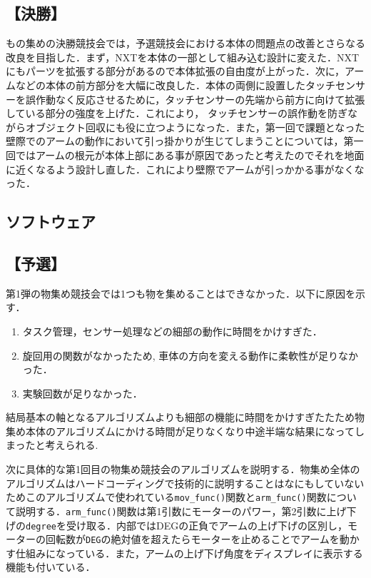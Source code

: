 \begin{multicols*}{2}
\subsection*{【決勝】}
もの集めの決勝競技会では，予選競技会における本体の問題点の改善とさらなる改良を目指した．まず，NXTを本体の一部として組み込む設計に変えた．NXTにもパーツを拡張する部分があるので本体拡張の自由度が上がった．次に，アームなどの本体の前方部分を大幅に改良した．本体の両側に設置したタッチセンサーを誤作動なく反応させるために，タッチセンサーの先端から前方に向けて拡張している部分の強度を上げた．これにより， タッチセンサーの誤作動を防ぎながらオブジェクト回収にも役に立つようになった．また，第一回で課題となった壁際でのアームの動作において引っ掛かりが生じてしまうことについては，第一回ではアームの根元が本体上部にある事が原因であったと考えたのでそれを地面に近くなるよう設計し直した．これにより壁際でアームが引っかかる事がなくなった．

\subsection{ソフトウェア}%
\subsection*{【予選】}%
第1弾の物集め競技会では1つも物を集めることはできなかった．以下に原因を示す．
\begin{enumerate}
   \item タスク管理，センサー処理などの細部の動作に時間をかけすぎた．
  \item 旋回用の関数がなかったため, 車体の方向を変える動作に柔軟性が足りなかった．
  \item 実験回数が足りなかった．
\end{enumerate}
結局基本の軸となるアルゴリズムよりも細部の機能に時間をかけすぎたたため物集め本体のアルゴリズムにかける時間が足りなくなり中途半端な結果になってしまったと考えられる. 

次に具体的な第1回目の物集め競技会のアルゴリズムを説明する．物集め全体のアルゴリズムはハードコーディングで技術的に説明することはなにもしていないためこのアルゴリズムで使われている\texttt{mov\_func()}関数と\texttt{arm\_func()}関数について説明する．\texttt{arm\_func()}関数は第1引数にモーターのパワー，第2引数に上げ下げの\texttt{degree}を受け取る．内部ではDEGの正負でアームの上げ下げの区別し，モーターの回転数が\texttt{DEG}の絶対値を超えたらモーターを止めることでアームを動かす仕組みになっている．また，アームの上げ下げ角度をディスプレイに表示する機能も付いている．


\end{multicols*}
